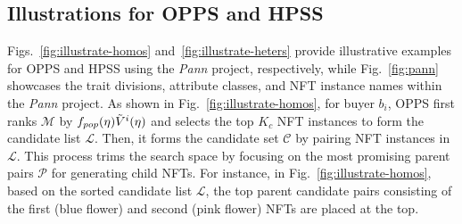 \documentclass[conference]{IEEEtran}
\theoremstyle{plain}
\begin{document}
{\subsection{Illustrations for OPPS\xspace and HPSS\xspace}
\label{appsubsec:breeding-utility}

    Figs.~\ref{fig:illustrate-homos} and~\ref{fig:illustrate-heters} provide illustrative examples for OPPS\xspace and HPSS\xspace using the \emph{Pann} project, respectively, while Fig.~\ref{fig:pann} showcases the trait divisions, attribute classes, and NFT instance names within the \emph{Pann} project. As shown in Fig.~\ref{fig:illustrate-homos}, for buyer $b_i$, OPPS\xspace first ranks $\mathcal{M}$ by $f_{pop}(\eta)\Tilde{V}^i(\eta)$ and selects the top $K_c$ NFT instances to form the candidate list $\mathcal{L}$. Then, it forms the candidate set $\mathcal{C}$ by pairing NFT instances in $\mathcal{L}$. This process trims the search space by focusing on the most promising parent pairs $\mathcal{P}$ for generating child NFTs. For instance, in Fig.~\ref{fig:illustrate-homos}, based on the sorted candidate list $\mathcal{L}$, the top parent candidate pairs consisting of the first (blue flower) and second (pink flower) NFTs are placed at the top.
    
}
\end{document}
